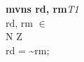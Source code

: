 


\begin{instructionblock}{\imagewidth}%
    \textbf{mvns rd, rm}\hfill\textit{T1}\\
    rd, rm $\in$ \baseregisters\\
    {N Z}\\
    rd = \textasciitilde rm;
\end{instructionblock}

